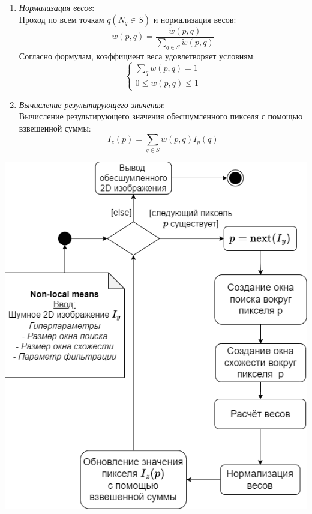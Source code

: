 \begin{enumerate}[]
\begin{minipage}{\textwidth}
	\end{minipage}
	\item \textit{Нормализация весов}:\\
	Проход по всем точкам $q (N_q \in S)$ и нормализация весов:
	 \begin{equation}
		w(p,q) = \frac{\tilde w(p,q)}{\sum_{q \in S} \tilde w(p,q)} 
	\end{equation}
	Согласно формулам, коэффициент веса удовлетворяет условиям:
	\begin{equation}
		\left\{ 
		\begin{array}{ll} 
			\sum_{q} w(p,q) = 1\\
			0 \leq w(p,q) \leq 1 \end{array}\right.
	\end{equation}	
	\item \textit{Вычисление результирующего значения}:\\
	Вычисление результирующего значения обесшумленного пикселя с помощью взвешенной суммы:
	\begin{equation}
		I_z(p) = \sum_{q \in S}w(p,q)I_y(q)
	\end{equation}
\end{enumerate}

\begin{minipage}{\textwidth}
	\centering
	\vspace{\mfloatsep} %
	\includegraphics[keepaspectratio=true,scale=0.47] {my_folder/images/denoising/pipeline_nlm_ru.png}
	\label{fig:nlm-schema}  
	\vspace{\mfloatsep} %
\end{minipage}
